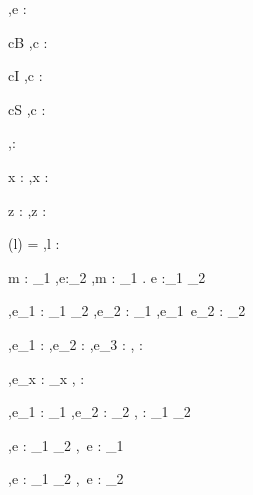 




  {\Gamma,\Sigma \infers e : \tau}


  {c\in B}
  {\Gamma,\Sigma \infers c : \Bool}

  {c\in I}
  {\Gamma,\Sigma \infers c : \Int}

  {c\in S}
  {\Gamma,\Sigma \infers c : \String}


  { }
  {\Gamma,\Sigma \infers \unit : \Unit}


  {x : \tau \in \Gamma}
  {\Gamma,\Sigma \infers x : \tau}

  {z : \beta \in \Gamma}
  {\Gamma,\Sigma \infers z : \beta}

  {\Sigma(l) = \beta}
  {\Gamma,\Sigma \infers l : \Reference \beta}


%
  {\infers m : \tau_1 \To \Delta \Quad
   \Gamma \cup \Delta,\Sigma \infers e:\tau_2}
  {\Gamma,\Sigma \infers \lambda m : \tau_1 . e :\tau_1 \to \tau_2}

  {\Gamma,\Sigma \infers e_1 : \tau_1 \to \tau_2 \Quad
   \Gamma,\Sigma \infers e_2 : \tau_1}
  {\Gamma,\Sigma \infers e_1\ e_2 : \tau_2}


  {\Gamma,\Sigma \infers e_1 : \Bool \Quad
   \Gamma,\Sigma \infers e_2 : \tau \Quad
   \Gamma,\Sigma \infers e_3 : \tau}
  {\Gamma,\Sigma \infers {} : \tau}


    { \Quad
     \Gamma,\Sigma \infers e_x : \tau_x}
    {\Gamma,\Sigma \infers {} : }

    {\Gamma,\Sigma \infers e_1 : \tau_1  \Quad
     \Gamma,\Sigma \infers e_2 : \tau_2}
    {\Gamma,\Sigma \infers {} : \tau_1 \times \tau_2}

  {\Gamma,\Sigma \infers e : \tau_1 \times \tau_2}
  {\Gamma,\Sigma \infers \Fst\ e : \tau_1}

  {\Gamma,\Sigma \infers e : \tau_1 \times \tau_2}
  {\Gamma,\Sigma \infers \Snd\ e : \tau_2}


